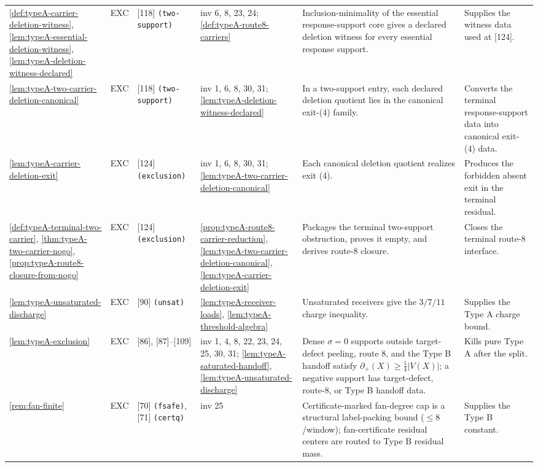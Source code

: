 \documentclass[11pt]{article}
\newcommand{\defp}{\partial_+}
\begin{document}
{\begin{longtable}{L{0.10\textwidth} C{0.045\textwidth} L{0.13\textwidth} L{0.135\textwidth} L{0.28\textwidth} L{0.20\textwidth}}
\cref{def:typeA-carrier-deletion-witness}, \cref{lem:typeA-essential-deletion-witness}, \cref{lem:typeA-deletion-witness-declared} & EXC & [118] \texttt{(two-support)} & inv 6, 8, 23, 24; \cref{def:typeA-route8-carriers} & Inclusion-minimality of the essential response-support core gives a declared deletion witness for every essential response support. & Supplies the witness data used at [124]. \\
\cref{lem:typeA-two-carrier-deletion-canonical} & EXC & [118] \texttt{(two-support)} & inv 1, 6, 8, 30, 31; \cref{lem:typeA-deletion-witness-declared} & In a two-support entry, each declared deletion quotient lies in the canonical exit-(4) family. & Converts the terminal response-support data into canonical exit-(4) data. \\
\cref{lem:typeA-carrier-deletion-exit} & EXC & [124] \texttt{(exclusion)} & inv 1, 6, 8, 30, 31; \cref{lem:typeA-two-carrier-deletion-canonical} & Each canonical deletion quotient realizes exit (4). & Produces the forbidden absent exit in the terminal residual. \\
\cref{def:typeA-terminal-two-carrier}, \cref{thm:typeA-two-carrier-nogo}, \cref{prop:typeA-route8-closure-from-nogo} & EXC & [124] \texttt{(exclusion)} & \cref{prop:typeA-route8-carrier-reduction}, \cref{lem:typeA-two-carrier-deletion-canonical}, \cref{lem:typeA-carrier-deletion-exit} & Packages the terminal two-support obstruction, proves it empty, and derives route-8 closure. & Closes the terminal route-8 interface. \\
\cref{lem:typeA-unsaturated-discharge} & EXC & [90] \texttt{(unsat)} & \cref{lem:typeA-receiver-loads}, \cref{lem:typeA-threshold-algebra} & Unsaturated receivers give the $3/7/11$ charge inequality. & Supplies the Type A charge bound. \\
\cref{lem:typeA-exclusion} & EXC & [86], [87]--[109] & inv 1, 4, 8, 22, 23, 24, 25, 30, 31; \cref{lem:typeA-saturated-handoff}, \cref{lem:typeA-unsaturated-discharge} & Dense $\sigma=0$ supports outside target-defect peeling, route 8, and the Type B handoff satisfy $\defp(X)\ge\tfrac14|V(X)|$; a negative support has target-defect, route-8, or Type B handoff data. & Kills pure Type A after the split. \\
\cref{rem:fan-finite} & EXC & [70] \texttt{(fsafe)}, [71] \texttt{(certq)} & inv 25 & Certificate-marked fan-degree cap is a structural label-packing bound ($\le8$/window); fan-certificate residual centers are routed to Type B residual mass. & Supplies the Type B constant. \\

\end{longtable}}
\end{document}
